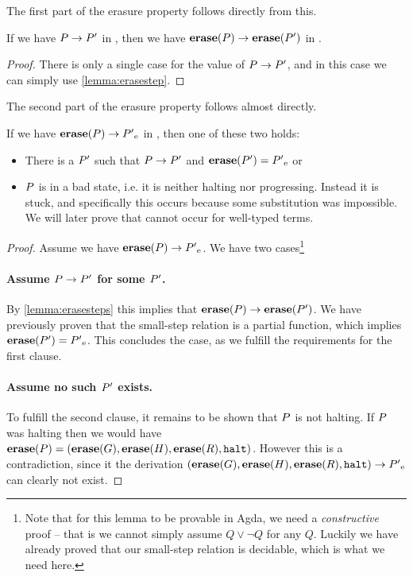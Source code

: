The first part of the erasure property follows directly from this.

\begin{corollary}
  \label{lemma:erasesteps}
  If we have ${P} -> {P'}$ in \ATAL, then we have
  ${{\mathbf{erase}}(P)} -> {{\mathbf{erase}}(P')}$ in \ATALe.
\end{corollary}
\begin{proof}
  There is only a single case for the value of ${P} -> {P'}$, and
  in this case we can simply use \cref{lemma:erasestep}.
\end{proof}

The second part of the erasure property follows almost directly.
\begin{lemma}
  \item If we have ${{\mathbf{erase}}(P)} -> {{{P'}_{\mathrm{e}}}}$ in \ATALe, then one of
  these two holds:
  \begin{itemize}
  \item There is a $P'$ such that ${P} -> {P'}$ and
    ${\mathbf{erase}}(P') = {{P'}_{\mathrm{e}}}$ or
  \item $P$ is in a bad state, i.e. it is neither halting nor
    progressing. Instead it is stuck, and specifically this occurs because some
    substitution was impossible. We will later prove that cannot occur for
    well-typed terms.
  \end{itemize}
\end{lemma}
\begin{proof}
  Assume we have ${{\mathbf{erase}}(P)} -> {{{P'}_{\mathrm{e}}}}$. We have two
  cases\footnote{Note that for this lemma to be provable in Agda, we need a
    \emph{constructive} proof -- that is we cannot simply assume $Q \lor \neg Q$
    for any $Q$. Luckily we have already proved that our small-step relation is
    decidable, which is what we need here.}

  \paragraph{Assume ${P} -> {P'}$ for some $P'$.} By
  \cref{lemma:erasesteps} this implies that
  ${{\mathbf{erase}}(P)} -> {{\mathbf{erase}}(P')}$. We have previously proven that
  the small-step relation is a partial function, which implies
  ${\mathbf{erase}}(P') = {{P'}_{\mathrm{e}}}$. This concludes the case, as we fulfill the
  requirements for the first clause.

  \paragraph{Assume no such $P'$ exists.} To fulfill the second clause, it
  remains to be shown that $P$ is not halting. If $P$ was halting
  then we would have
  ${\mathbf{erase}}(P) = ({\mathbf{erase}}(G), {\mathbf{erase}}(H), {\mathbf{erase}}(R),
  \mathtt{halt})$. However this is a contradiction, since it the derivation
  ${({\mathbf{erase}}(G), {\mathbf{erase}}(H), {\mathbf{erase}}(R),
    \mathtt{halt})} -> {{{P'}_{\mathrm{e}}}}$ can clearly not exist.
\end{proof}

